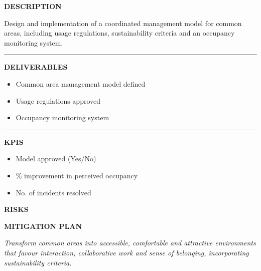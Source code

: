 \documentclass[11pt,a4paper]{scrreprt}
\newcommand{\fieldlabel}[1]{%
  {\footnotesize\sffamily\bfseries\color{mutedcolor}\MakeUppercase{#1}}\par\nopagebreak[4]
}
\newcommand{\fieldsep}{\vspace{3pt}\noindent\textcolor{bordercolor}{\rule{\linewidth}{0.4pt}}\vspace{3pt}\par}
\begin{document}
\begin{tcolorbox}[pabox={espcolor}{A.P.7.2 \enspace\textbullet\enspace Implementation of a Management and Optimisation System for Common Areas}]

\fieldlabel{Description}
{\small Design and implementation of a coordinated management model for common areas, including usage regulations, sustainability criteria and an occupancy monitoring system.}\par
\fieldsep
\fieldlabel{Deliverables}
{\small \begin{itemize}[noitemsep,topsep=2pt]
\item Common area management model defined
\item Usage regulations approved
\item Occupancy monitoring system
\end{itemize}}\par
\fieldsep
\fieldlabel{KPIs}
{\small \begin{itemize}[noitemsep,topsep=2pt]
\item Model approved (Yes/No)
\item \% improvement in perceived occupancy
\item No. of incidents resolved
\end{itemize}}\par
\end{tcolorbox}
\begin{tcolorbox}[riskbox]
{\footnotesize\sffamily\bfseries\color{red!50!black} RISKS}\par{}
\end{tcolorbox}
\begin{tcolorbox}[mitbox]
{\footnotesize\sffamily\bfseries\color{green!40!black} MITIGATION PLAN}\par{}
\end{tcolorbox}
\vspace{8pt}

\newpage
{}
{\small\color{mutedcolor}\itshape Transform common areas into accessible, comfortable and attractive environments that favour interaction, collaborative work and sense of belonging, incorporating sustainability criteria.}\par\vspace{6pt}
\end{document}
